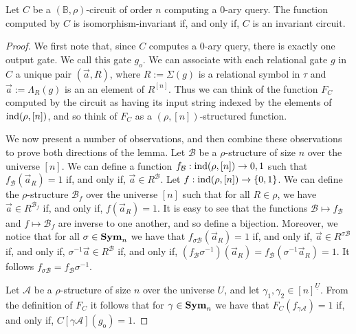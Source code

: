 \documentclass[../paper.tex]{subfiles}
\begin{document}
\begin{lem}
  Let $C$ be a $(\mathbb{B}, \rho)$-circuit of order $n$ computing a $0$-ary
  query. The function computed by $C$ is isomorphism-invariant if, and only if,
  $C$ is an invariant circuit.
\end{lem}
\begin{proof}
  We first note that, since $C$ computes a $0$-ary query, there is exactly one
  output gate. We call this gate $g_o$. We can associate with each relational
  gate $g$ in $C$ a unique pair $(\vec{a}, R)$, where $R := \Sigma (g)$ is a
  relational symbol in $\tau$ and $\vec{a} := \Lambda_R(g)$ is an an element of
  $R^{[n]}$. Thus we can think of the function $F_C$ computed by the circuit as
  having its input string indexed by the elements of $\text{\upshape ind}(\rho, [n])$, and so
  think of $F_C$ as a $(\rho, [n])$-structured function.


  We now present a number of observations, and then combine these observations
  to prove both directions of the lemma. Let $\mathcal{B}$ be a $\rho$-structure
  of size $n$ over the universe $[n]$. We can define a function $f_{\mathcal{B}}
  : \text{\upshape ind}(\rho, [n]) \rightarrow {0,1}$ such that $f_{\mathcal{B}} (\vec{a}_R) =
  1$ if, and only if, $\vec{a} \in R^{\mathcal{B}}$. Let $f : \text{\upshape ind}(\rho, [n])
  \rightarrow \{0,1\}$. We can define the $\rho$-structure $\mathcal{B}_f$ over
  the universe $[n]$ such that for all $R \in \rho$, we have $\vec{a} \in
  R^{\mathcal{B}_f}$ if, and only if, $f(\vec{a}_R) = 1$. It is easy to see that
  the functions $\mathcal{B} \mapsto f_{\mathcal{B}}$ and $f \mapsto
  \mathcal{B}_f$ are inverse to one another, and so define a bijection.
  Moreover, we notice that for all $\sigma \in \text{\textbf{Sym}}_n$ we have that $f_{\sigma
    \mathcal{B}}(\vec{a}_R) = 1$ if, and only if, $\vec{a} \in R^{\sigma
    \mathcal{B}}$ if, and only if, $\sigma^{-1} \vec{a} \in R^{\mathcal{B}}$ if,
  and only if, $(f_{\mathcal{B}} \sigma^{-1})(\vec{a}_R) =
  f_{\mathcal{B}}(\sigma^{-1} \vec{a}_R)= 1$. It follows $f_{\sigma \mathcal{B}}
  = f_{\mathcal{B}} \sigma^{-1}$.

  Let $\mathcal{A}$ be a $\rho$-structure of size $n$ over the universe $U$, and
  let $\gamma_1, \gamma_2 \in [n]^{\underline{U}}$. From the definition of $F_C$
  it follows that for $\gamma \in \text{\textbf{Sym}}_n$ we have that $F_C (f_{\gamma
    \mathcal{A}})=1$ if, and only if, $C[\gamma \mathcal{A}](g_{\text{o}}) = 1$.


\end{proof}
\end{document}
